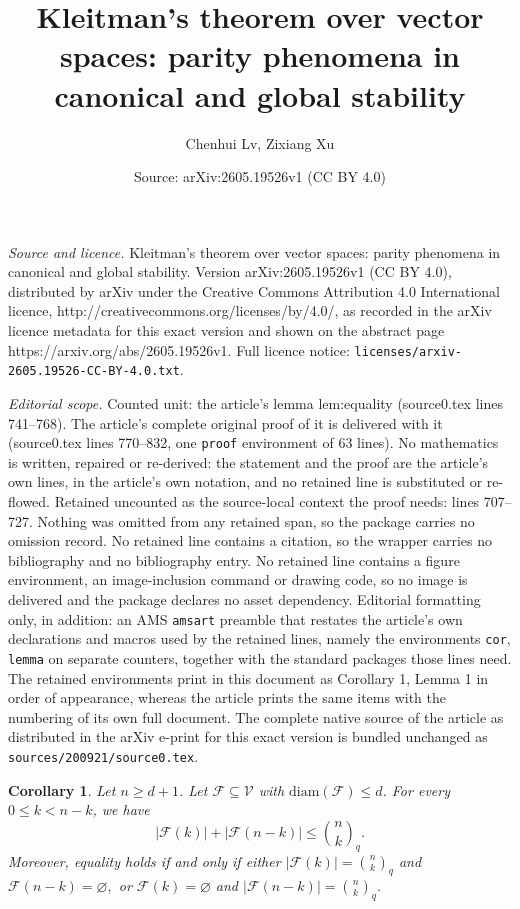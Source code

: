 \documentclass[10pt,a4paper]{amsart}
\title{Kleitman's theorem over vector spaces: parity phenomena in canonical and global stability}
\author{Chenhui Lv, Zixiang Xu}
\date{Source: arXiv:2605.19526v1 (CC BY 4.0)}
\newtheorem{cor}{Corollary}
\newcommand{\diam}{\mathrm{diam}}
\newcommand{\qbinom}[2]{\genfrac{(}{)}{0pt}{}{#1}{#2}_q}
\begin{document}
\maketitle

\noindent\emph{Source and licence.} Kleitman's theorem over vector spaces: parity phenomena in canonical and global stability. Version arXiv:2605.19526v1 (CC BY 4.0), distributed by arXiv under the Creative Commons Attribution 4.0 International licence, http://creativecommons.org/licenses/by/4.0/, as recorded in the arXiv licence metadata for this exact version and shown on the abstract page https://arxiv.org/abs/2605.19526v1. Full licence notice: \texttt{licenses/arxiv-2605.19526-CC-BY-4.0.txt}.\par\smallskip

\noindent\textit{Editorial scope.} Counted unit: the article's lemma lem:equality (source0.tex lines 741--768). The article's complete original proof of it is delivered with it (source0.tex lines 770--832, one \texttt{proof} environment of 63 lines). No mathematics is written, repaired or re-derived: the statement and the proof are the article's own lines, in the article's own notation, and no retained line is substituted or re-flowed.  Retained uncounted as the source-local context the proof needs: lines 707--727.  Nothing was omitted from any retained span, so the package carries no omission record.  No retained line contains a citation, so the wrapper carries no bibliography and no bibliography entry.  No retained line contains a figure environment, an image-inclusion command or drawing code, so no image is delivered and the package declares no asset dependency.  Editorial formatting only, in addition: an AMS \texttt{amsart} preamble that restates the article's own declarations and macros used by the retained lines, namely the environments \texttt{cor}, \texttt{lemma} on separate counters, together with the standard packages those lines need.  The retained environments print in this document as Corollary 1, Lemma 1 in order of appearance, whereas the article prints the same items with the numbering of its own full document.  The complete native source of the article as distributed in the arXiv e-print for this exact version is bundled unchanged as \texttt{sources/200921/source0.tex}.
\begin{cor}\label{lem:complementsum-1}
Let $n\ge d+1$. Let $\mathcal{F} \subseteq \mathcal{V}$ with $\diam(\mathcal{F}) \le d$. For every $0\le k<n-k$, we have
\[
|\mathcal{F}(k)|+|\mathcal{F}(n-k)|
\le
\qbinom{n}{k}.
\]
Moreover, equality holds if and only if either
\(
|\mathcal{F}(k)|=\qbinom{n}{k}\)
and
\(
\mathcal{F}(n-k)=\varnothing,
\)
or
\(
\mathcal{F}(k)=\varnothing\)
and \(
|\mathcal{F}(n-k)|=\qbinom{n}{k}.
\)
\end{cor}
\end{document}
